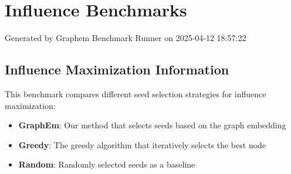 \documentclass{article}
\begin{document}
\section*{Influence Benchmarks}
Generated by Graphem Benchmark Runner on 2025-04-12 18:57:22
\subsection*{Influence Maximization Information}
This benchmark compares different seed selection strategies for influence maximization:
\begin{itemize}
\item \textbf{GraphEm}: Our method that selects seeds based on the graph embedding
\item \textbf{Greedy}: The greedy algorithm that iteratively selects the best node
\item \textbf{Random}: Randomly selected seeds as a baseline
\end{itemize}
\end{document}
